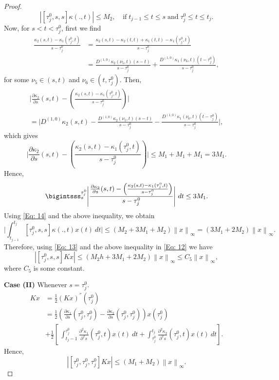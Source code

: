 \documentclass[sn-mathphys-num]{sn-jnl}%
\theoremstyle{thmstyleone}%
\theoremstyle{thmstyletwo}%
\theoremstyle{thmstylethree}%
\newcommand{\norm}[1]{\left\lVert #1\right\rVert}
\begin{document}
\begin{proof}
\begin{equation}
		\left|[\tau_j^0,s,s]\kappa(.,t)\right| \le M_2, ~ \; \;\; \text{if} \; t_{j-1} \le t \le s \; \text{and} \; \tau_j^0 \le t \le t_j.
	\end{equation}
	Now, for $s < t < \tau_j^0$, first we find
	\begin{align*}
		\frac{\kappa_2(s,t)-\kappa_1(\tau_j^0,t)}{s-\tau_j^0} &= \frac{\kappa_2(s,t)-\kappa_2(t,t)+\kappa_1(t,t)-\kappa_1(\tau_j^0,t)}{s-\tau_j^0} \\
		&= \frac{D^{(1,0)}\kappa_2(\nu_5,t)(s-t)}{s-\tau_j^0}+\frac{D^{(1,0)}\kappa_1(\nu_6,t)(t-\tau_j^0)}{s-\tau_j^0},
	\end{align*}
	for some $\nu_5 \in (s,t)$ and $\nu_6 \in (t, \tau_j^0)$.
	Then, 
	\begin{multline*}
		\Bigg | \frac{\partial \kappa_2}{\partial s}(s,t)- \left ( \frac{\kappa_2(s,t)-\kappa_1(\tau_j^0,t)}{s-\tau_j^0}\right ) \Bigg | \\ = \Bigg | D^{(1,0)}\kappa_2(s,t)- \frac{D^{(1,0)}\kappa_2(\nu_5,t)(s-t)}{s-\tau_j^0}-\frac{D^{(1,0)}\kappa_1(\nu_6,t)(t-\tau_j^0)}{s-\tau_j^0}\Bigg |,
	\end{multline*}
	which gives
	$$
	\Bigg | \frac{\partial \kappa_2}{\partial s}(s,t)- \left ( \frac{\kappa_2(s,t)-\kappa_1(\tau_j^0,t)}{s-\tau_j^0}\right ) \Bigg | \le M_1 +M_1+M_1=3M_1.
	$$
	Hence,
	$$
	\bigintsss_{s}^{\tau_j^0}\Bigg | \dfrac{\frac{\partial \kappa_2}{\partial s}(s,t)- \left ( \frac{\kappa_2(s,t)-\kappa_1(\tau_j^0,t)}{s-\tau_j^0}\right) }{s-\tau_j^0} \Bigg |~dt \le 3M_1.
	$$
	Using \eqref{Eq: 14} and the above inequality, we obtain
	$$
	\bigg |\int_{t_{j-1}}^{t_j} [\tau_j^0,s,s] \kappa(.,t) x(t) ~dt \bigg | 
	\le \left ( M_2 +3 M_1 + M_2 \right )\norm{x}_\infty = \left ( 3 M_1  + 2 M_2 \right )\norm{x}_\infty.
	$$ 
	Therefore, using \eqref{Eq: 13} and the above inequality in \eqref{Eq: 12} we have
	\begin{equation}\label{Eq: 15}
		\left |[\tau_j^0,s,s]Kx \right| \le \left ( M_2 h +3 M_1  + 2 M_2 \right )\norm{x}_\infty \le C_5 \norm{x}_\infty,
	\end{equation}
	where $C_5$ is some constant.
	
	\noindent
	\textbf{Case (II)}
	Whenever $s = \tau_j^0$.
	\begin{align*}
		[\tau_j^0,\tau_j^0,\tau_j^0]Kx&= \frac{1}{2} (Kx)^{''}(\tau_j^0)\\
		&= \frac{1}{2}\left ( \frac{\partial \kappa_1}{\partial s}(\tau_j^0,\tau_j^0)-\frac{\partial \kappa_2}{\partial s}(\tau_j^0,\tau_j^0)\right )x(\tau_j^0)\\&+\frac{1}{2}\left [~ \int_{t_j-1}^{\tau_j^0}\frac{\partial^2 \kappa_1}{\partial^2 s}(\tau_j^0,t)x(t)~dt+\int_{\tau_j^0}^{t_j}\frac{\partial^2 \kappa_2}{\partial^2 s}(\tau_j^0,t)x(t)~dt\right ]. 
	\end{align*}
	Hence, 
	\begin{equation}\label{Eq: 16}
		\left |[\tau_j^0,\tau_j^0,\tau_j^0]Kx\right| \le \left ( M_1+ M_2\right )\norm{x}_\infty. 
	\end{equation}
	

\end{proof}
\end{document}
